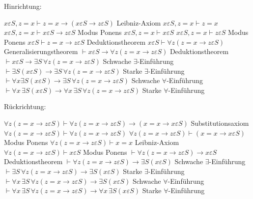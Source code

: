 \begin{solution}
Hinrichtung:
\begin{algorithmic}[1]
    \State $x \varepsilon S, z = x \vdash z = x \rightarrow
    (x \varepsilon S \rightarrow z \varepsilon S)$
    \Comment Leibniz-Axiom
    \State $x \varepsilon S, z = x \vdash z = x$
    \State $x \varepsilon S, z = x \vdash x \varepsilon S \rightarrow z \varepsilon S$
    \Comment Modus Ponens
    \State $x \varepsilon S, z = x \vdash x \varepsilon S$
    \State $x \varepsilon S, z = x \vdash z \varepsilon S$
    \Comment Modus Ponens
    \State $x \varepsilon S \vdash z = x \rightarrow z \varepsilon S$
    \Comment Deduktionstheorem
    \State $x \varepsilon S \vdash \forall z (z = x \rightarrow z \varepsilon S)$
    \Comment Generalisierungstheorem
    \State $\vdash x \varepsilon S \rightarrow \forall z (z = x \rightarrow z \varepsilon S)$
    \Comment Deduktionstheorem
    \State $\vdash x \varepsilon S \rightarrow \exists S\, \forall z (z = x \rightarrow z \varepsilon S)$
    \Comment Schwache $\exists$-Einführung
    \State $\vdash \exists S (x \varepsilon S) \rightarrow \exists S\, \forall z (z = x \rightarrow z \varepsilon S)$
    \Comment Starke $\exists$-Einführung
    \State $\vdash \forall x \exists S (x \varepsilon S) \rightarrow \exists S\, \forall z (z = x \rightarrow z \varepsilon S)$
    \Comment Schwache $\forall$-Einführung
    \State $\vdash \forall x\, \exists S (x \varepsilon S) \rightarrow \forall x\, \exists S\, \forall z (z = x \rightarrow z \varepsilon S)$
    \Comment Starke $\forall$-Einführung
\end{algorithmic}
\pagebreak
Rückrichtung:
\begin{algorithmic}[1]
    \State $\forall z (z = x \rightarrow z \varepsilon S) \vdash
    \forall z (z = x \rightarrow z \varepsilon S)
    \rightarrow (x = x \rightarrow x \varepsilon S)$
    \Comment Substitutionsaxiom
    \State $\forall z(z = x \rightarrow z \varepsilon S) \vdash \forall z (z = x \rightarrow z \varepsilon S)$
    \State $\forall z(z = x \rightarrow z \varepsilon S) \vdash (x = x \rightarrow x \varepsilon S)$
    \Comment Modus Ponens
    \State $\forall z(z = x \rightarrow z \varepsilon S) \vdash x = x$
    \Comment Leibniz-Axiom
    \State $\forall z(z = x \rightarrow z \varepsilon S) \vdash x \varepsilon S$
    \Comment Modus Ponens
    \State $\vdash \forall z (z = x \rightarrow z \varepsilon S) \rightarrow x \varepsilon S$
    \Comment Deduktionstheorem
    \State $\vdash \forall z (z = x \rightarrow z \varepsilon S) \rightarrow \exists S (x \varepsilon S)$
    \Comment Schwache $\exists$-Einführung
    \State $\vdash \exists S\, \forall z (z = x \rightarrow z \varepsilon S) \rightarrow \exists S (x \varepsilon S)$
    \Comment Starke $\exists$-Einführung
    \State $\vdash \forall x\, \exists S\, \forall z (z = x \rightarrow z \varepsilon S) \rightarrow \exists S (x \varepsilon S)$
    \Comment Schwache $\forall$-Einführung
    \State $\vdash \forall x\, \exists S\, \forall z (z = x \rightarrow z \varepsilon S)
    \rightarrow \forall x\, \exists S (x \varepsilon S)$
    \Comment Starke $\forall$-Einführung
\end{algorithmic}
\end{solution}

